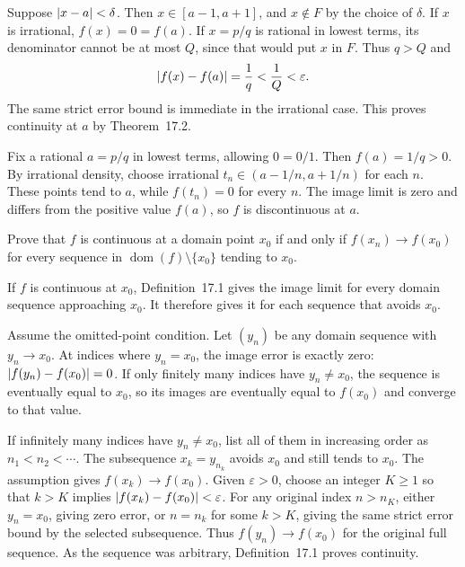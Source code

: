 Suppose $\left|x-a\right|<\delta$. Then $x\in[a-1,a+1]$,
and $x\notin F$ by the choice of $\delta$.
If $x$ is irrational, $f(x)=0=f(a)$.
If $x=p/q$ is rational in lowest terms, its denominator cannot
be at most $Q$, since that would put $x$ in $F$.
Thus $q>Q$ and
\[
 \left|f(x)-f(a)\right|=\frac1q<\frac1Q<\varepsilon.
\]
The same strict error bound is immediate in the irrational case.
This proves continuity at $a$ by Theorem~17.2.

Fix a rational $a=p/q$ in lowest terms, allowing $0=0/1$.
Then $f(a)=1/q>0$. By irrational density, choose irrational
$t_n\in(a-1/n,a+1/n)$ for each $n$.
These points tend to $a$, while $f(t_n)=0$ for every $n$.
The image limit is zero and differs from the positive value
$f(a)$, so $f$ is discontinuous at $a$.

\goal Prove that $f$ is continuous at a domain point $x_0$
if and only if $f(x_n)\to f(x_0)$ for every sequence in
$\operatorname{dom}(f)\setminus\{x_0\}$ tending to $x_0$.

If $f$ is continuous at $x_0$, Definition~17.1 gives the image
limit for every domain sequence approaching $x_0$.
It therefore gives it for each sequence that avoids $x_0$.

Assume the omitted-point condition. Let $(y_n)$ be any domain
sequence with $y_n\to x_0$. At indices where $y_n=x_0$,
the image error is exactly zero:
$\left|f(y_n)-f(x_0)\right|=0$.
If only finitely many indices have $y_n\ne x_0$, the sequence
is eventually equal to $x_0$, so its images are eventually
equal to $f(x_0)$ and converge to that value.

If infinitely many indices have $y_n\ne x_0$, list all of
them in increasing order as $n_1<n_2<\cdots$.
The subsequence $x_k=y_{n_k}$ avoids $x_0$ and still tends
to $x_0$. The assumption gives $f(x_k)\to f(x_0)$.
Given $\varepsilon>0$, choose an integer $K\ge1$ so that
$k>K$ implies $\left|f(x_k)-f(x_0)\right|<\varepsilon$.
For any original index $n>n_K$, either $y_n=x_0$, giving
zero error, or $n=n_k$ for some $k>K$, giving the same
strict error bound by the selected subsequence.
Thus $f(y_n)\to f(x_0)$ for the original full sequence.
As the sequence was arbitrary, Definition~17.1 proves continuity.

